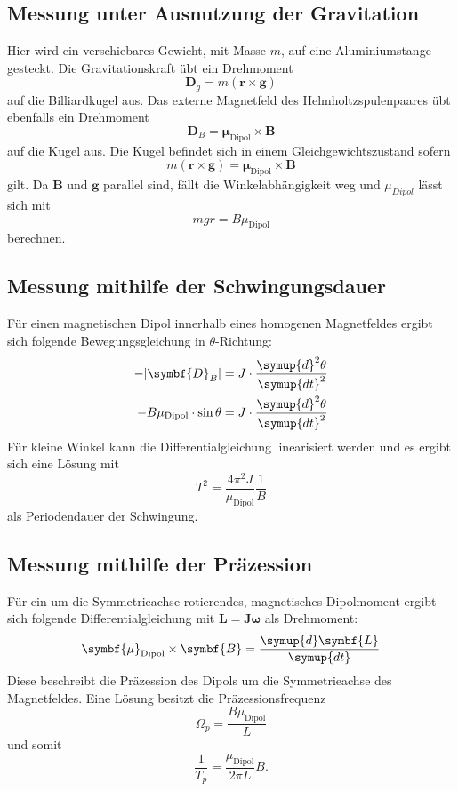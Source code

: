 \subsection{Messung unter Ausnutzung der Gravitation}
Hier wird ein verschiebares Gewicht, mit Masse $m$, auf eine Aluminiumstange gesteckt.
Die Gravitationskraft übt ein Drehmoment
\begin{equation}
  \symbf{D}_g = m (\symbf{r} \times \symbf{g})
\end{equation}
auf die Billiardkugel aus.
Das externe Magnetfeld des Helmholtzspulenpaares übt ebenfalls ein Drehmoment
\begin{equation}
  \symbf{D}_B = \symbf{\mu}_\text{Dipol} \times \symbf{B}
\end{equation}
auf die Kugel aus.
Die Kugel befindet sich in einem Gleichgewichtszustand sofern
\begin{equation}
    m (\symbf{r} \times \symbf{g}) = \symbf{\mu}_\text{Dipol} \times \symbf{B}
\end{equation}
 gilt.
 Da $\symbf{B}$ und $\symbf{g}$ parallel sind, fällt die Winkelabhängigkeit weg und $\mu_{Dipol}$ lässt sich mit
 \begin{equation}
   mgr = B\mu_\text{Dipol}
 \end{equation}
 berechnen.
%
\subsection{Messung mithilfe der Schwingungsdauer}
Für einen magnetischen Dipol innerhalb eines homogenen Magnetfeldes ergibt sich folgende Bewegungsgleichung in 
$\theta$-Richtung:
\begin{align}
    -\lvert\symbf{D}_B\rvert &= J \cdot \frac{\symup{d}^2\theta}{\symup{dt}^2} \notag \\
    -B\mu_\text{Dipol}\cdot \sin{\theta} &= J \cdot \frac{\symup{d}^2\theta}{\symup{dt}^2}
\end{align}
Für kleine Winkel kann die Differentialgleichung linearisiert werden und es ergibt sich eine Lösung mit
\begin{equation}
    T^2 = \frac{4\pi^2J}{\mu_\text{Dipol}}\frac{1}{B}
\end{equation}
als Periodendauer der Schwingung.
%
\subsection{Messung mithilfe der Präzession}
Für ein um die Symmetrieachse rotierendes, magnetisches Dipolmoment ergibt sich folgende Differentialgleichung mit 
\mbox{$\symbf{L}=\symbf{J\omega}$} als Drehmoment:
\begin{equation}
    \symbf{\mu}_\text{Dipol} \times \symbf{B} = \frac{\symup{d}\symbf{L}}{\symup{dt}}
\end{equation}
Diese beschreibt die Präzession des Dipols um die Symmetrieachse des Magnetfeldes.
Eine Lösung besitzt die Präzessionsfrequenz
\begin{equation}
    \Omega_p = \frac{B\mu_\text{Dipol}}{L}
\end{equation}
und somit
\begin{equation}
    \frac{1}{T_p} = \frac{\mu_\text{Dipol}}{2\pi L}B .
\end{equation}
